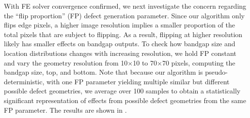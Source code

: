 \documentclass[preprint,review,12pt]{elsarticle}
\begin{document}
With FE solver convergence confirmed, we next investigate the concern regarding the ``flip proportion'' (FP) defect generation parameter. Since our algorithm only flips edge pixels, a higher image resolution implies a smaller proportion of the total pixels that are subject to flipping. As a result, flipping at higher resolution likely has smaller effects on bandgap outputs. To check how bandgap size and location distributions changes with increasing resolution, we hold FP constant and vary the geometry resolution from 10$\times$10 to 70$\times$70 pixels, computing the bandgap size, top, and bottom. Note that because our algorithm is pseudo-deterministic, with one FP parameter yielding multiple similar but different possible defect geometries, we average over 100 samples to obtain a statistically significant representation of effects from possible defect geometries from the same FP parameter. The results are shown in .

\end{document}
